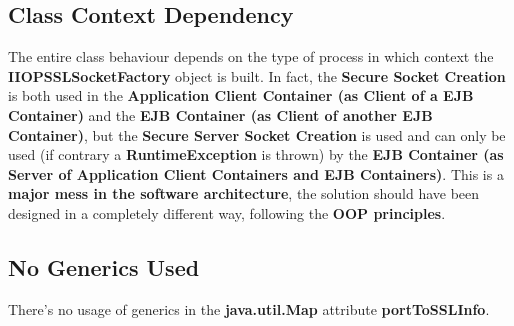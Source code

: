 \subsection{Class Context Dependency}
The entire class behaviour depends on the type of process in which context the \textbf{IIOPSSLSocketFactory} object is built.
In fact, the \textbf{Secure Socket Creation} is both used in the \textbf{Application Client Container (as Client of a EJB Container)} and the \textbf{EJB Container (as Client of another EJB Container)}, but the \textbf{Secure Server Socket Creation} is used and can only be used (if contrary a \textbf{RuntimeException} is thrown) by the \textbf{EJB Container (as Server of Application Client Containers and EJB Containers)}.
This is a \textbf{major mess in the software architecture}, the solution should have been designed in a completely different way, following the \textbf{OOP principles}.
%
\subsection{No Generics Used}
There's no usage of generics in the \textbf{java.util.Map} attribute \textbf{portToSSLInfo}.
